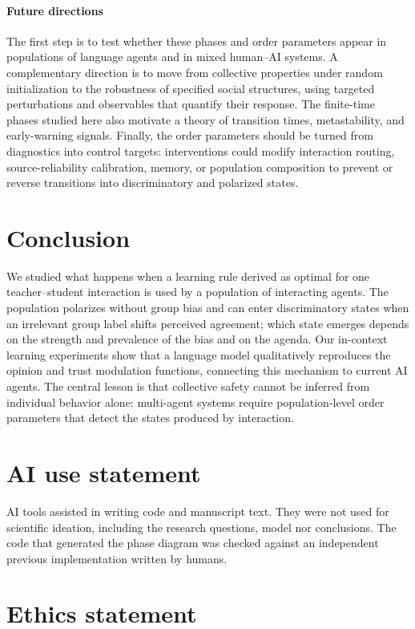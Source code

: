 \documentclass{article}
\begin{document}
\paragraph{Future directions}
The first step is to test whether these phases and order parameters appear in populations of language agents and in mixed human--AI systems. A complementary direction is to move from collective properties under random initialization to the robustness of specified social structures, using targeted perturbations and observables that quantify their response. The finite-time phases studied here also motivate a theory of transition times, metastability, and early-warning signals. Finally, the order parameters should be turned from diagnostics into control targets: interventions could modify interaction routing, source-reliability calibration, memory, or population composition to prevent or reverse transitions into discriminatory and polarized states.

\section{Conclusion}

We studied what happens when a learning rule derived as optimal for one
teacher--student interaction is used by a population of interacting agents. The
population polarizes without group bias and can enter discriminatory states when
an irrelevant group label shifts perceived agreement; which state emerges depends
on the strength and prevalence of the bias and on the agenda. Our in-context
learning experiments show that a language model qualitatively reproduces the
opinion and trust modulation functions, connecting this mechanism to current AI
agents. The central lesson is that collective safety cannot be inferred from
individual behavior alone: multi-agent systems require population-level order
parameters that detect the states produced by interaction.

\section*{AI use statement}

AI tools assisted in writing code and manuscript text. They were not used for
scientific ideation, including the research questions, model nor conclusions. The
code that generated the phase diagram was checked against an independent previous implementation written by humans.

\section*{Ethics statement}
\end{document}
